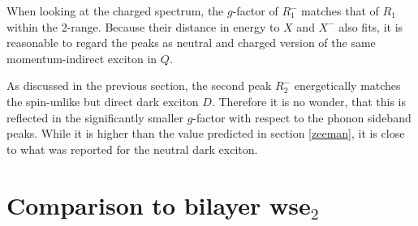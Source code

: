 When looking at the charged spectrum, the $g$-factor of $R_1^-$ matches that of $R_1$ within the 2\sigma-range. Because their distance in energy to $X$ and $X^-$ also fits, it is reasonable to regard the peaks as neutral and charged version of the same momentum-indirect exciton in $Q$.

As discussed in the previous section, the second peak $R_2^-$ energetically matches the spin-unlike but direct dark exciton $D$. Therefore it is no wonder, that this is reflected in the significantly smaller $g$-factor with respect to the phonon sideband peaks. While it is higher than the value predicted in section \ref{zeeman}, it is close to what was reported for the neutral dark exciton\cite{robert_fine_2017}.

\section{Comparison to bilayer ws\textup{e}$_2$}

